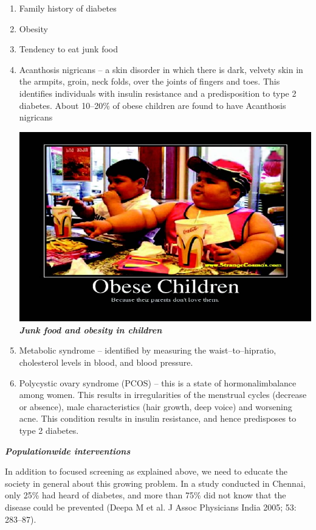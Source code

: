 \vspace{-\topsep}
\begin{enumerate}[•]
\itemsep=0pt
\item Family history of diabetes
\item Obesity
\item Tendency to eat junk food
\item Acanthosis nigricans – a skin disorder in which there is dark, velvety skin in the armpits, groin, neck folds, over the joints of fingers and toes. This identifies individuals with insulin resistance and a predisposition to type 2 diabetes. About 10–20\% of obese children are found to have Acanthosis nigricans

\includegraphics[scale=1.2]{images/026.jpg}\\
\small\textbf{\textit{Junk food and obesity in children}}

\item Metabolic syndrome – identified by measuring the waist–to–hip\break ratio, cholesterol levels in blood, and blood pressure.
\item Polycystic ovary syndrome (PCOS) – this is a state of hormonal\break imbalance among women. This results in irregularities of the menstrual cycles (decrease or absence), male characteristics (hair growth, deep voice) and worsening acne. This condition results in insulin resi\-stance, and hence predisposes to type 2 diabetes.
\end{enumerate}

\noindent\textbf{\textit{Populationwide interventions}}

In addition to focused screening as explained above, we need to educate the society in general about this growing problem. In a study conducted in Chennai, only 25\% had heard of diabetes, and more than 75\% did not know that the disease could be prevented (Deepa M et al. J Assoc Physicians India 2005; 53: 283–87).


